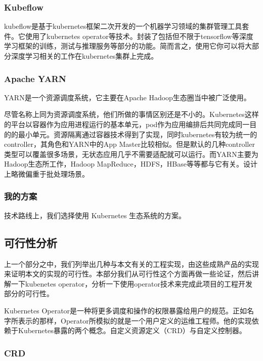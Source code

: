 \subsubsection{Kubeflow}

kubeflow是基于kubernetes框架二次开发的一个机器学习领域的集群管理工具套件。它使用了kubernetes operator等技术。封装了包括但不限于tensorflow等深度学习框架的训练，测试与推理服务等部分的功能。简而言之，使用它你可以将大部分深度学习相关的工作在kubernetes集群上完成。

\subsubsection{Apache YARN}

YARN是一个资源调度系统，它主要在Apache Hadoop生态圈当中被广泛使用。

尽管名称上同为资源调度系统，他们所做的事情区别还是不小的。Kubernetes这样的平台以容器作为应用进程运行的基本单元，pod作为应用编排后共同完成同一目的的最小单元。资源隔离通过容器技术得到了实现，同时kubernetes有较为统一的controller，其角色和YARN中的App Master比较相似。但是默认的几种controller类型可以覆盖很多场景，无状态应用几乎不需要适配就可以运行。而YARN主要为Hadoop生态所工作，Hadoop MapReduce，HDFS，HBase等等都与它有关。设计上略微偏重于批处理场景。

\subsubsection{我的方案}

技术路线上，我们选择使用 Kubernetes 生态系统的方案。

\subsection{可行性分析}

上一个部分之中，我们列举出几种与本文有关的工程实现，由这些成熟产品的实现来证明本文的实现的可行性。本部分我们从可行性这个方面再做一些论证，然后讲解一下kubenetes operator，分析一下使用operator技术来完成此项目的工程开发部分的可行性。

Kubernetes Operator是一种将更多调度和操作的权限暴露给用户的规范。正如名字所表示的那样，Operator所模拟的就是一个用户定义的运维工程师。他的实现依赖于Kubernetes暴露的两个概念。自定义资源定义（CRD）与自定义控制器。

\subsubsection*{CRD}


